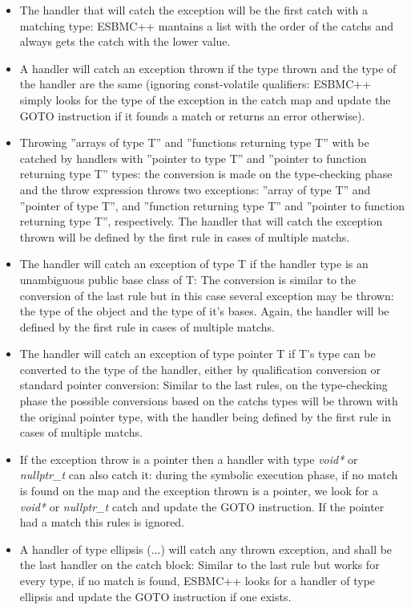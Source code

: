 \documentclass[a4paper]{llncs}
\begin{document}
\begin{itemize}
 \item The handler that will catch the exception will be the first catch with a matching type: ESBMC++ mantains a list with the order of
       the catchs and always gets the catch with the lower value.
 \item A handler will catch an exception thrown if the type thrown and the type of the handler are the same (ignoring const-volatile
       qualifiers: ESBMC++ simply looks for the type of the exception in the catch map and update the GOTO instruction if it founds a
       match or returns an error otherwise).
 \item Throwing ''arrays of type T'' and ''functions returning type T'' with be catched by handlers with ''pointer to type T'' and
       ''pointer to function returning type T'' types: the conversion is made on the type-checking phase and the throw expression throws
       two exceptions: ''array of type T'' and ''pointer of type T'', and ''function returning type T'' and ''pointer to function returning
       type T'', respectively. The handler that will catch the exception thrown will be defined by the first rule in cases of multiple
       matchs.
 \item The handler will catch an exception of type T if the handler type is an unambiguous public base class of T: The conversion is similar
       to the conversion of the last rule but in this case several exception may be thrown: the type of the object and the type of it's
       bases. Again, the handler will be defined by the first rule in cases of multiple matchs.
 \item The handler will catch an exception of type pointer T if T's type can be converted to the type of the handler, either by
       qualification conversion or standard pointer conversion: Similar to the last rules, on the type-checking phase the possible
       conversions based on the catchs types will be thrown with the original pointer type, with the handler being defined by the first rule
       in cases of multiple matchs.
 \item If the exception throw is a pointer then a handler with type \textit{void*} or \textit{nullptr\_t} can also catch it: during the symbolic execution phase, if no match is found on the map and the exception thrown is a pointer, we look for a \textit{void*} or \textit{nullptr\_t} catch and update the GOTO instruction. If the pointer had a match this rules is ignored.
 \item A handler of type ellipsis (...) will catch any thrown exception, and shall be the last handler on the catch block: Similar to the
       last rule but works for every type, if no match is found, ESBMC++ looks for a handler of type ellipsis and update the GOTO
       instruction if one exists.
\end{itemize}
\end{document}
